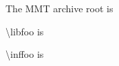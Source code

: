 \documentclass[minimal]{omdoc}
\begin{document}
\makeatletter
The MMT archive root is \mh@currentrepos


\textbackslash libfoo is \libfoo

\textbackslash inffoo is \inffoo
\end{document}
